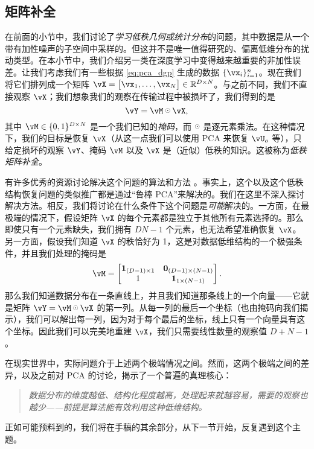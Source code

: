 \documentclass[../../book-main.tex]{subfiles}
\begin{document}

\subsection{矩阵补全}

在前面的小节中，我们讨论了\textit{学习低秩几何或统计分布}的问题，其中数据是从一个带有加性噪声的子空间中采样的。但这并不是唯一值得研究的、偏离低维分布的扰动类型。在本小节中，我们介绍另一类在深度学习中变得越来越重要的非加性误差。让我们考虑我们有一些根据 \eqref{eq:pca_dgp} 生成的数据 \(\{\vx_{i}\}_{i = 1}^{n}\)。现在我们将它们排列成一个矩阵 \(\vX = \mat{\vx_{1}, \dots, \vx_{N}} \in \R^{D \times N}\)。与之前不同，我们不直接观察 \(\vX\)；我们想象我们的观察在传输过程中被损坏了，我们得到的是
\begin{equation}
    \vY = \vM \hada \vX,
\end{equation}
其中 \(\vM \in \{0, 1\}^{D \times N}\) 是一个我们已知的\textit{掩码}，而 \(\hada\) 是逐元素乘法。在这种情况下，我们的目标是恢复 \(\vX\)（从这一点我们可以使用 PCA 来恢复 \(\vU_{o}\) 等），只给定损坏的观察 \(\vY\)、掩码 \(\vM\) 以及 \(\vX\) 是（近似）低秩的知识。这被称为\textit{低秩矩阵补全}。

有许多优秀的资源讨论解决这个问题的算法和方法 \cite{Wright-Ma-2022}。事实上，这个以及这个低秩结构恢复问题的类似推广都是通过“鲁棒 PCA”来解决的。我们在这里不深入探讨解决方法。相反，我们将讨论在什么条件下这个问题是\textit{可能}解决的。一方面，在最极端的情况下，假设矩阵 \(\vX\) 的每个元素都是独立于其他所有元素选择的。那么即使只有一个元素缺失，我们拥有 \(DN - 1\) 个元素，也无法希望准确恢复 \(\vX\)。另一方面，假设我们知道 \(\vX\) 的秩恰好为 1，这是对数据低维结构的一个极强条件，并且我们处理的掩码是
\begin{equation}
    \vM = \mat{\vone_{(D - 1) \times 1} & \vzero_{(D - 1) \times (N - 1)} \\ 1 & \vone_{1 \times (N - 1)} }.
\end{equation}
那么我们知道数据分布在一条直线上，并且我们知道那条线上的一个向量——它就是矩阵 \(\vY = \vM \hada \vX\) 的第一列。从每一列的最后一个坐标（也由掩码向我们揭示），我们可以解出每一列，因为对于每个最后的坐标，线上只有一个向量具有这个坐标。因此我们可以完美地重建 \(\vX\)，我们只需要线性数量的观察值 \(D + N - 1\)。

在现实世界中，实际问题介于上述两个极端情况之间。然而，这两个极端之间的差异，以及之前对 PCA 的讨论，揭示了一个普遍的真理核心：
\begin{quote}
    \centering
    \textit{数据分布的维度越低、结构化程度越高，处理起来就越容易，需要的观察也越少——前提是算法能有效利用这种低维结构。}
\end{quote}
正如可能预料到的，我们将在手稿的其余部分，从下一节开始，反复遇到这个主题。
\end{document}
